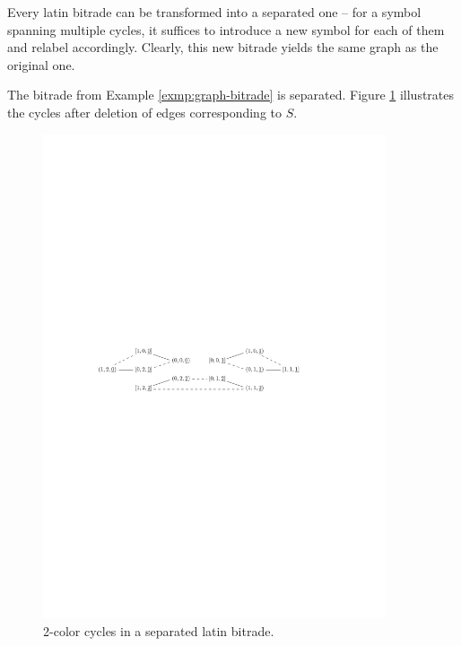 Every latin bitrade can be transformed into a separated one -- for a symbol spanning multiple cycles, it suffices to introduce a new symbol for each of them and relabel accordingly. Clearly, this new bitrade yields the same graph as the original one.

\begin{exmp}
The bitrade from Example \ref{exmp:graph-bitrade} is separated. Figure \ref{fig:separated-graph} illustrates the cycles after deletion of edges corresponding to $S$.

\begin{figure}[htb]
\centering
\includegraphics[width=0.9\textwidth]{img/separated.pdf}
\caption{2-color cycles in a separated latin bitrade.}
\label{fig:separated-graph}
\end{figure}
\end{exmp}%


